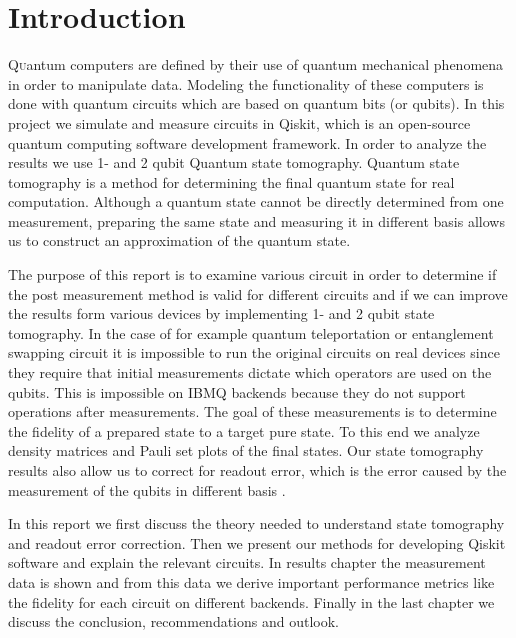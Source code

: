 \section{Introduction}

\lettrine[nindent=0em,lines=3]{Q} uantum computers are defined by their use of quantum mechanical phenomena in order to manipulate data. Modeling the functionality of these computers is done with quantum circuits which are based on quantum bits (or qubits). In this project we simulate and measure circuits in Qiskit, which is an open-source quantum computing software development framework. In order to analyze the results we use 1- and 2 qubit Quantum state tomography. Quantum state tomography is a method for determining the final quantum state for real computation. Although a quantum state cannot be directly determined from one measurement, preparing the same state and measuring it in different basis allows us to construct an approximation of the quantum state.

The purpose of this report is to examine various circuit in order to determine if the post measurement method is valid for different circuits and if we can improve the results form various devices by implementing 1- and 2 qubit state tomography. In the case of for example quantum teleportation or entanglement swapping circuit it is impossible to run the original circuits on real devices since they require that initial measurements dictate which operators are used on the qubits. This is impossible on IBMQ backends because they do not support operations after measurements. The goal of these measurements is to determine the fidelity of a prepared state to a target pure state. To this end we analyze density matrices and Pauli set plots of the final states. Our state tomography results also allow us to correct for readout error, which is the error caused by the measurement of the qubits in different basis \cite{nielsen10_quant}.

In this report we first discuss the theory needed to understand state tomography and readout error correction. Then we present our methods for developing Qiskit software and explain the relevant circuits. In results chapter the measurement data is shown and from this data we derive important performance metrics like the fidelity for each circuit on different backends. Finally in the last chapter we discuss the conclusion, recommendations and outlook.
